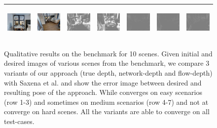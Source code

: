 \documentclass[letterpaper, 10 pt, conference]{ieeeconf}  %
\begin{document}
\begin{figure}[h!]
\begin{center}
\begin{tabular}{|c| c |c | c | c | c | c|}
 \\ \hline
\includegraphics[width=18mm, height=17mm]{TrueDepth/DENMARK/init.png} &   
            \includegraphics[width=18mm, height=17mm]{TrueDepth/DENMARK/des.png} &  \includegraphics[width=18mm, height=17mm]{PhotoVS/DENMARK/ferror.png} & 

           \includegraphics[width=18mm, height=17mm]{ICRA17/DENMARK/ferror.png} & 
 \includegraphics[width=18mm, height=17mm]{TrueDepth/DENMARK/ferror.png} &
  \includegraphics[width=18mm, height=17mm]{DepthNetwork/DENMARK/ferror.png} &
   \includegraphics[width=18mm, height=17mm]{FlowDepth/DENMARK/ferror.png}
 \\ \hline
      \end{tabular}
\caption{Qualitative results on the benchmark for 10 scenes. Given initial and desired images of various scenes from the benchmark, we compare 3 variants of our approach (true depth, network-depth and flow-depth) with  Saxena et al. \cite{servonet} and show the error image between desired and resulting pose of the approach. While \cite{servonet} converges on easy scenarios (row 1-3) and sometimes on medium scenarios (row 4-7) and not at converge on hard scenes. All the variants are able to converge on all test-cases.}
 \label{fig:bench_qual}
 \end{center}
 \end{figure}
\end{document}
